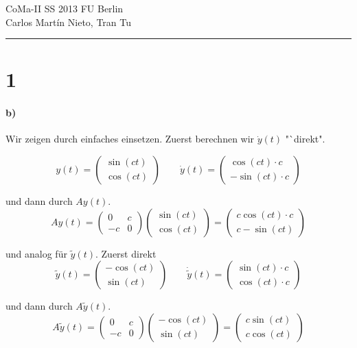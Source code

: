 \documentclass[ngerman,a4paper]{scrartcl}
\begin{document}
{\sffamily
  \hfill
  CoMa-II SS 2013\hfill
  FU Berlin\\[8pt]
  \hfill Carlos Martín Nieto, Tran Tu\hrule \bigskip
}

\section*{1}

\paragraph{b)}

Wir zeigen durch einfaches einsetzen. Zuerst berechnen wir $\dot{y}(t)$ "`direkt".

\[
  y(t) =
  \begin{pmatrix}
    \sin(ct)\\ \cos(ct)
  \end{pmatrix}
  \qquad
  \dot{y}(t) =
  \begin{pmatrix}
    \cos(ct)\cdot c\\ -\sin(ct) \cdot c
  \end{pmatrix}
\]

und dann durch $Ay(t)$.
\[
  Ay(t) =
  \begin{pmatrix}
    0 & c\\ -c & 0
  \end{pmatrix}
  \begin{pmatrix}
    \sin(ct)\\ \cos(ct)
  \end{pmatrix} =
  \begin{pmatrix}
    c \cos(ct)\cdot c\\ c -\sin(ct)
  \end{pmatrix}
\]

und analog für $\tilde{y}(t)$. Zuerst direkt
\[
  \tilde{y}(t) =
  \begin{pmatrix}
    -\cos(ct)\\ \sin(ct)
  \end{pmatrix}
  \qquad
  \dot{\tilde{y}}(t) =
  \begin{pmatrix}
    \sin(ct) \cdot c\\ \cos(ct)\cdot c
  \end{pmatrix}
\]

und dann durch $A\tilde{y}(t)$.
\[
  A\tilde{y}(t) =
  \begin{pmatrix}
    0 & c\\ -c & 0
  \end{pmatrix}
  \begin{pmatrix}
    -\cos(ct)\\ \sin(ct)
  \end{pmatrix} =
  \begin{pmatrix}
    c \sin(ct) \\ c \cos(ct)
  \end{pmatrix}
\]
\end{document}
